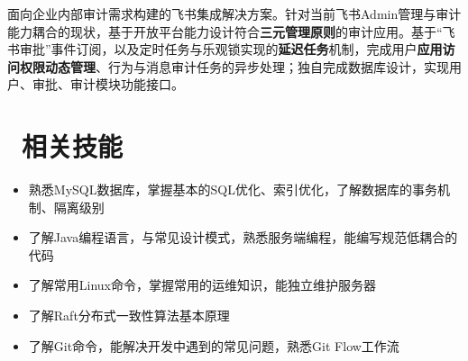 \documentclass{resume}
\begin{document}
  \begin{onehalfspacing}
    面向企业内部审计需求构建的飞书集成解决方案。针对当前飞书Admin管理与审计能力耦合的现状，基于开放平台能力设计符合\textbf{三元管理原则}的审计应用。基于“飞书审批”事件订阅，以及定时任务与乐观锁实现的\textbf{延迟任务}机制，完成用户\textbf{应用访问权限动态管理}、行为与消息审计任务的异步处理；独自完成数据库设计，实现用户、审批、审计模块功能接口。

  \end{onehalfspacing}

\section{\faInfo\ 相关技能}
  \begin{onehalfspacing}
    \begin{itemize}
      \item 熟悉MySQL数据库，掌握基本的SQL优化、索引优化，了解数据库的事务机制、隔离级别
      \item 了解Java编程语言，与常见设计模式，熟悉服务端编程，能编写规范低耦合的代码
      \item 了解常用Linux命令，掌握常用的运维知识，能独立维护服务器
      \item 了解Raft分布式一致性算法基本原理
      \item 了解Git命令，能解决开发中遇到的常见问题，熟悉Git Flow工作流
    \end{itemize}
  \end{onehalfspacing}
\end{document}
